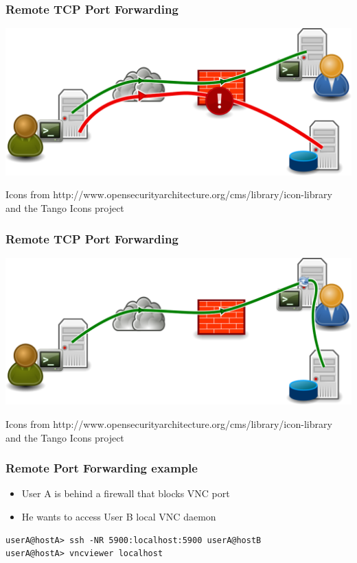 \begin{frame}
    \frametitle{Remote TCP Port Forwarding}
\begin{center}
    \includegraphics[height=.34\paperheight]{drawing-4.png}
\end{center}
\begin{flushright}
    \tiny\color{white}Icons from http://www.opensecurityarchitecture.org/cms/library/icon-library\\and the Tango Icons project
\end{flushright}
\end{frame}
\begin{frame}
    \frametitle{Remote TCP Port Forwarding}
\begin{center}
    \includegraphics[height=.34\paperheight]{drawing-5.png}
\end{center}
\begin{flushright}
    \tiny\color{white}Icons from http://www.opensecurityarchitecture.org/cms/library/icon-library\\and the Tango Icons project
\end{flushright}
\end{frame}
\begin{frame}[fragile]
\frametitle{Remote Port Forwarding example}
\begin{itemize}
\item User A is behind a firewall that blocks VNC port
\item He wants to access User B local VNC daemon
\end{itemize}
\begin{lstlisting}
userA@hostA> ssh -NR 5900:localhost:5900 userA@hostB
userA@hostA> vncviewer localhost
\end{lstlisting}

\end{frame}

